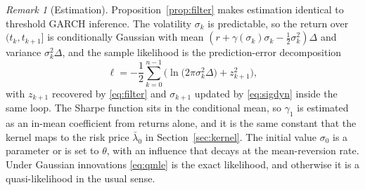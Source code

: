 \documentclass[11pt]{article}
\theoremstyle{remark}
\newtheorem{remark}[theorem]{Remark}
\newcommand{\Dt}{\Delta}
\begin{document}
\begin{remark}[Estimation]\label{rem:qmle}
Proposition~\ref{prop:filter} makes estimation identical to threshold GARCH
inference.
The volatility $\sigma_k$ is predictable, so the return over
$(t_k,t_{k+1}]$ is conditionally Gaussian with mean
$(r+\gamma(\sigma_k)\sigma_k-\tfrac{1}{2}\sigma_k^2)\Dt$ and variance
$\sigma_k^2\Dt$, and the sample likelihood is the prediction-error
decomposition
\begin{equation}\label{eq:qmle}
\ell=-\frac{1}{2}\sum_{k=0}^{n-1}
\Big(\ln\big(2\pi\sigma_k^2\Dt\big)+z_{k+1}^2\Big),
\end{equation}
with $z_{k+1}$ recovered by \eqref{eq:filter} and $\sigma_{k+1}$ updated by
\eqref{eq:sigdyn} inside the same loop.
The Sharpe function sits in the conditional mean, so $\gamma_1$ is
estimated as an in-mean coefficient from returns alone, and it is the same
constant that the kernel maps to the risk price $\bar\lambda_0$ in
Section~\ref{sec:kernel}.
The initial value $\sigma_0$ is a parameter or is set to $\theta$, with an
influence that decays at the mean-reversion rate.
Under Gaussian innovations \eqref{eq:qmle} is the exact likelihood, and
otherwise it is a quasi-likelihood in the usual sense.
\end{remark}
\end{document}
